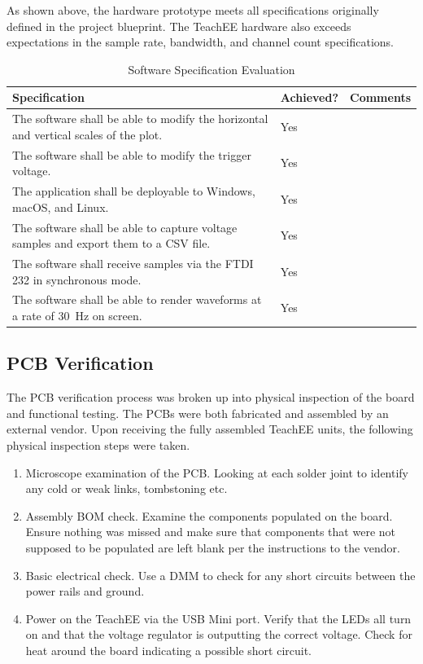 \documentclass[letterpaper,11pt]{article}
\begin{document}
As shown above, the hardware prototype meets all specifications originally
defined in the project blueprint. The TeachEE hardware also exceeds expectations
in the sample rate, bandwidth, and channel count specifications.

\begin{table}[H]
  \caption{Software Specification Evaluation}
  \begin{tabularx}{\textwidth}{l|l|p{5cm}}
    Specification & Achieved? & Comments\\
    \hline
    The software shall be able to modify the horizontal and vertical scales of the plot. & Yes & \\
    The software shall be able to modify the trigger voltage. & Yes & \\
    The application shall be deployable to Windows, macOS, and Linux. & Yes & \\
    \hline
    The software shall be able to capture voltage samples and export them to a CSV file. & Yes & \\
    The software shall receive samples via the FTDI 232 in synchronous mode. & Yes & \\
    \hline
    The software shall be able to render waveforms at a rate of \SI{30}{\hertz} on screen. & Yes & \\
    \hline
  \end{tabularx} 
  \label{tab:sw-spec-eval}
\end{table}

\subsection{PCB Verification} %
The PCB verification process was broken up into physical inspection of the board
and functional testing. The PCBs were both fabricated and assembled by an
external vendor. Upon receiving the fully assembled TeachEE units, the following
physical inspection steps were taken.

\begin{enumerate}
  \item Microscope examination of the PCB. Looking at each solder joint to
    identify any cold or weak links, tombstoning etc.
  \item Assembly BOM check. Examine the components populated on the board.
    Ensure nothing was missed and make sure that components that were not
    supposed to be populated are left blank per the instructions to the vendor.
  \item Basic electrical check. Use a DMM to check for any short circuits
    between the power rails and ground.
  \item Power on the TeachEE via the USB Mini port. Verify that the LEDs all
    turn on and that the voltage regulator is outputting the correct voltage.
    Check for heat around the board indicating a possible short circuit.
\end{enumerate}
\end{document}
